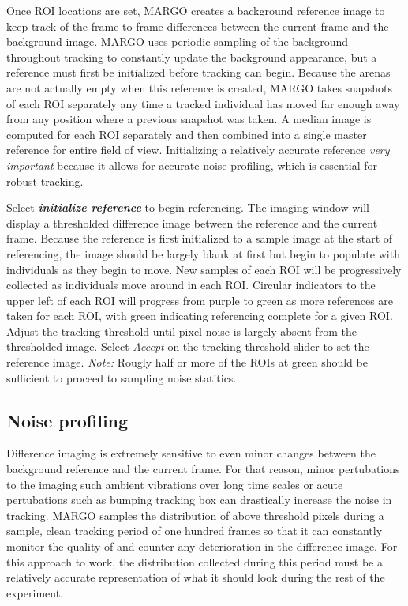 \documentclass[11pt]{article}
\begin{document}
Once ROI locations are set, MARGO creates a background reference image to keep track of the frame to frame differences between the current frame and the background image. MARGO uses periodic sampling of the background throughout tracking to constantly update the background appearance, but a reference must first be initialized before tracking can begin.  Because the arenas are not actually empty when this reference is created, MARGO takes snapshots of each ROI separately any time a tracked individual has moved far enough away from any position where a previous snapshot was taken. A median image is computed for each ROI separately and then combined into a single master reference for entire field of view. Initializing a relatively accurate reference \textit{very important} because it allows for accurate noise profiling, which is essential for robust tracking.

Select \textbf{\textit{initialize reference}} to begin referencing. The imaging window will display a thresholded difference image between the reference and the current frame. Because the reference is first initialized to a sample image at the start of referencing, the image should be largely blank at first but begin to populate with individuals as they begin to move. New samples of each ROI will be progressively collected as individuals move around in each ROI. Circular indicators to the upper left of each ROI will progress from purple to green as more references are taken for each ROI, with green indicating referencing complete for a given ROI. Adjust the tracking threshold until pixel noise is largely absent from the thresholded image. Select \textit{Accept} on the tracking threshold slider to set the reference image. \textit{Note:} Rougly half or more of the ROIs at green should be sufficient to proceed to sampling noise statitics.

\subsection{Noise profiling}

Difference imaging is extremely sensitive to even minor changes between the background reference and the current frame. For that reason, minor pertubations to the imaging such ambient vibrations over long time scales or acute pertubations such as bumping tracking box can drastically increase the noise in tracking. MARGO samples the distribution of above threshold pixels during a sample, clean tracking period of one hundred frames so that it can constantly monitor the quality of and counter any deterioration in the difference image. For this approach to work, the distribution collected during this period must be a relatively accurate representation of what it should look during the rest of the experiment.
\end{document}
